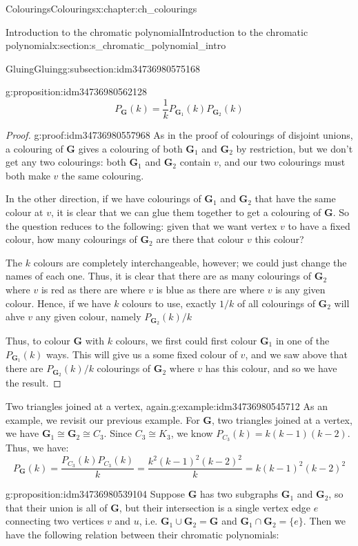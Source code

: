 \documentclass[oneside,10pt,]{book}
\numberwithin{equation}{section}
\newcommand{\bfG}{\mathbf{G}}
\begin{document}
\begin{chapterptx}{Colourings}{}{Colourings}{}{}{x:chapter:ch_colourings}
\begin{sectionptx}{Introduction to the chromatic polynomial}{}{Introduction to the chromatic polynomial}{}{}{x:section:s_chromatic_polynomial_intro}
\begin{subsectionptx}{Gluing}{}{Gluing}{}{}{g:subsection:idm34736980575168}
\begin{proposition}{}{}{g:proposition:idm34736980562128}
%
\begin{equation*}
P_{\bfG}(k)=\frac{1}{k}P_{\bfG_1}(k)P_{\bfG_2}(k)
\end{equation*}
\end{proposition}
\begin{proof}{}{g:proof:idm34736980557968}
As in the proof of colourings of disjoint unions, a colouring of \(\bfG\) gives a colouring of both \(\bfG_1\) and \(\bfG_2\) by restriction, but we don't get any two colourings: both \(\bfG_1\) and \(\bfG_2\) contain \(v\), and our two colourings must both make \(v\) the same colouring.%
\par
In the other direction, if we have colourings of \(\bfG_1\) and \(\bfG_2\) that have the same colour at \(v\), it is clear that we can glue them together to get a colouring of \(\bfG\).  So the question reduces to the following: given that we want vertex \(v\) to have a fixed colour, how many colourings of \(\bfG_2\) are there that colour \(v\) this colour?%
\par
The \(k\) colours are completely interchangeable, however; we could just change the names of each one.  Thus, it is clear that there are as many colourings of \(\bfG_2\) where \(v\) is red as there are where \(v\) is blue as there are where \(v\) is any given colour.  Hence, if we have \(k\) colours to use, exactly \(1/k\) of all colourings of \(\bfG_2\) will ahve \(v\) any given colour, namely \(P_{\bfG_2}(k)/k\)%
\par
Thus, to colour \(\bfG\) with \(k\) colours, we first could first colour \(\bfG_1\) in one of the \(P_{\bfG_1}(k)\) ways.  This will give us a some fixed colour of \(v\), and we saw above that there are \(P_{\bfG_2}(k)/k\) colourings of \(\bfG_2\) where \(v\) has this colour, and so we have the result.%
\end{proof}
\begin{example}{Two triangles joined at a vertex, again.}{g:example:idm34736980545712}%
As an example, we revisit our previous example.  For \(\bfG\), two triangles joined at a vertex, we have \(\bfG_1\cong \bfG_2\cong C_3\).  Since \(C_3\cong K_3\), we know \(P_{C_3}(k)=k(k-1)(k-2)\).  Thus, we have:%
%
\begin{equation*}
P_\bfG(k)=\frac{P_{C_3}(k)P_{C_3}(k)}{k}=\frac{k^2(k-1)^2(k-2)^2}{k}=k(k-1)^2(k-2)^2
\end{equation*}
\end{example}
\begin{proposition}{}{}{g:proposition:idm34736980539104}%
Suppose \(\bfG\) has two subgraphs \(\bfG_1\) and \(\bfG_2\), so that their union is all of \(\bfG\), but their intersection is a single vertex edge \(e\) connecting two vertices \(v\) and \(u\), i.e. \(\bfG_1\cup\bfG_2=\bfG\) and \(\bfG_1\cap\bfG_2=\{e\}\).  Then we have the following relation between their chromatic polynomials:%

\end{proposition}
\end{subsectionptx}
\end{sectionptx}
\end{chapterptx}
\end{document}
